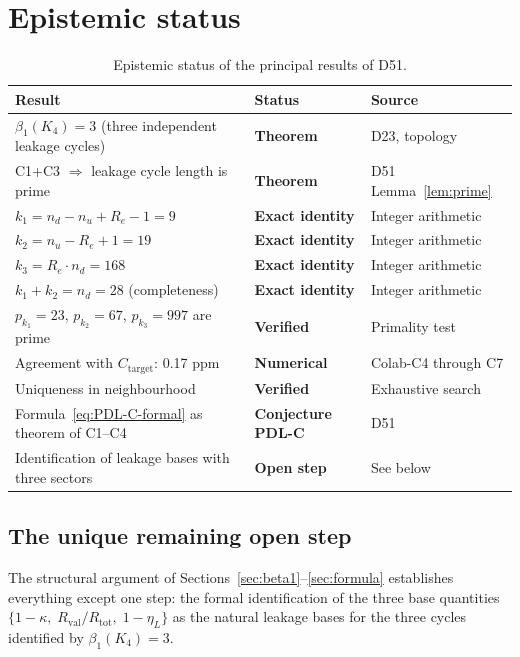 \documentclass[12pt,a4paper]{article}
\newcommand{\Kfour}{K_4}
\newcommand{\Rtot}{R_{\mathrm{tot}}}
\newcommand{\Rval}{R_{\mathrm{val}}}
\renewcommand{\Re}{R_e}
\newcommand{\kap}{\kappa}
\newcommand{\etaL}{\eta_L}
\begin{document}
\section{Epistemic status}
\label{sec:epistemic}

\begin{table}[H]
\centering
\caption{Epistemic status of the principal results of D51.}
\label{tab:epistemic}
\small
\begin{tabular}{p{8cm}p{3.2cm}p{3.5cm}}
\toprule
Result & Status & Source \\
\midrule
$\beta_1(\Kfour) = 3$ (three independent leakage cycles) & \textbf{Theorem} & D23, topology \\
C1+C3 $\Rightarrow$ leakage cycle length is prime & \textbf{Theorem} & D51 Lemma~\ref{lem:prime} \\
$k_1 = n_d - n_u + \Re - 1 = 9$ & \textbf{Exact identity} & Integer arithmetic \\
$k_2 = n_u - \Re + 1 = 19$ & \textbf{Exact identity} & Integer arithmetic \\
$k_3 = \Re \cdot n_d = 168$ & \textbf{Exact identity} & Integer arithmetic \\
$k_1 + k_2 = n_d = 28$ (completeness) & \textbf{Exact identity} & Integer arithmetic \\
$p_{k_1} = 23$, $p_{k_2} = 67$, $p_{k_3} = 997$ are prime & \textbf{Verified} & Primality test \\
Agreement with $C_{\text{target}}$: 0.17 ppm & \textbf{Numerical} & Colab-C4 through C7 \\
Uniqueness in neighbourhood & \textbf{Verified} & Exhaustive search \\
Formula~\eqref{eq:PDL-C-formal} as theorem of C1--C4 & \textbf{Conjecture PDL-C} & D51 \\
\midrule
Identification of leakage bases with three sectors & \textbf{Open step} & See below \\
\bottomrule
\end{tabular}
\end{table}

\subsection{The unique remaining open step}

The structural argument of Sections~\ref{sec:beta1}--\ref{sec:formula} establishes everything except one step: the formal identification of the three base quantities $\{1-\kap,\; \Rval/\Rtot,\; 1-\etaL\}$ as the natural leakage bases for the three cycles identified by $\beta_1(\Kfour) = 3$.
\end{document}
